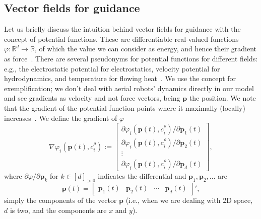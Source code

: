 \subsection{Vector fields for guidance}

Let us briefly discuss the intuition behind vector fields for guidance with the concept of potential functions. These are differentiable real-valued functions $\varphi:\mathbb{R}^d\rightarrow\mathbb{R}$, of which the value we can consider as energy, and hence their gradient as force~\citep{choset2005principles}. There are several pseudonyms for potential functions for different fields: e.g., the electrostatic potential for electrostatics, velocity potential for hydrodynamics, and temperature for flowing heat~\citep{needham1998visual}. We use the concept for exemplification; we don't deal with aerial robots' dynamics directly in our model and see gradients as velocity and not force vectors, being $\mathbf{p}$ the position. We note that the gradient of the potential function points where it maximally (locally) increases~\citep{choset2005principles}. We define the gradient of $\varphi$
\begin{equation}\label{eq:grady}
  \nabla\varphi_i(\mathbf{p}(t),c^\rho_i):=\begin{bmatrix}\partial\varphi_i(\mathbf{p}(t),c^\rho_i)/\partial\mathbf{p}_1(t)\\\partial\varphi_i(\mathbf{p}(t),c^\rho_i)/\partial\mathbf{p}_2(t)\\\vdots\\\partial\varphi_i(\mathbf{p}(t),c^\rho_i)/\partial\mathbf{p}_d(t)\end{bmatrix},
\end{equation}
where $\partial\varphi/\partial\mathbf{p}_k$ for $k\in[d]_{>0}$ indicates the differential and $\mathbf{p}_1,\mathbf{p}_2,\dots$ are 
\begin{equation}
  \mathbf{p}(t)=\begin{bmatrix}
    \mathbf{p}_1(t) & \mathbf{p}_2(t) & \cdots & \mathbf{p}_d(t)
  \end{bmatrix}',
\end{equation}
simply the components of the vector $\mathbf{p}$ (i.e., when we are dealing with 2D space, $d$ is two, and the components are $x$ and $y$). 

